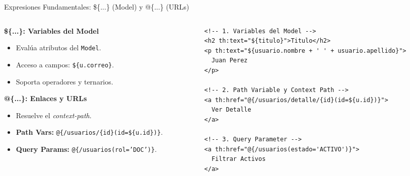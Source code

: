 \documentclass[aspectratio=169]{beamer}
\begin{document}
\begin{frame}[fragile]{Expresiones Fundamentales: \$\{...\} (Model) y @\{...\} (URLs)}
\begin{columns}[T]
\begin{column}{0.48\textwidth}
  \textbf{\$\{...\}: Variables del Model}
  \begin{itemize}
    \item Eval\'ua atributos del \texttt{Model}.
    \item Acceso a campos: \texttt{\$\{u.correo\}}.
    \item Soporta operadores y ternarios.
  \end{itemize}
  \vspace{3pt}
  \textbf{@\{...\}: Enlaces y URLs}
  \begin{itemize}
    \item Resuelve el \textit{context-path}.
    \item \textbf{Path Vars:} \texttt{@\{/usuarios/\{id\}(id=\$\{u.id\})\}}.
    \item \textbf{Query Params:} \texttt{@\{/usuarios(rol='DOC')\}}.
  \end{itemize}
\end{column}
\begin{column}{0.50\textwidth}
\begin{lstlisting}[style=ThymeleafStyle]
<!-- 1. Variables del Model -->
<h2 th:text="${titulo}">Titulo</h2>
<p th:text="${usuario.nombre + ' ' + usuario.apellido}">
  Juan Perez
</p>

<!-- 2. Path Variable y Context Path -->
<a th:href="@{/usuarios/detalle/{id}(id=${u.id})}">
  Ver Detalle
</a>

<!-- 3. Query Parameter -->
<a th:href="@{/usuarios(estado='ACTIVO')}">
  Filtrar Activos
</a>
\end{lstlisting}
\end{column}
\end{columns}
\end{frame}
\end{document}

